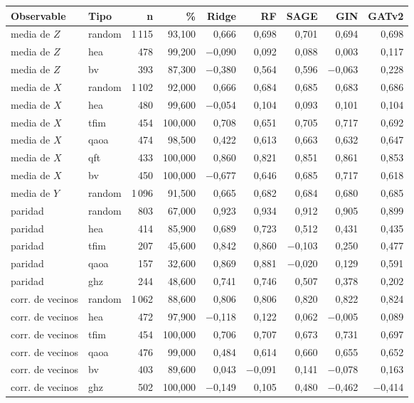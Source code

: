 \begin{table}[htbp]
    \centering
    {\footnotesize
    \begin{tabular}{@{}llrrrrrrr@{}}
        \toprule
        \textbf{Observable} & \textbf{Tipo} & \textbf{n} & \textbf{\%} & \textbf{Ridge} & \textbf{RF} & \textbf{SAGE} & \textbf{GIN} & \textbf{GATv2} \\
        \midrule
        media de $Z$ & random & 1\,115 & 93,100 & 0,666 & 0,698 & 0,701 & 0,694 & 0,698 \\
        media de $Z$ & hea & 478 & 99,200 & $-$0,090 & 0,092 & 0,088 & 0,003 & 0,117 \\
        media de $Z$ & bv & 393 & 87,300 & $-$0,380 & 0,564 & 0,596 & $-$0,063 & 0,228 \\
        media de $X$ & random & 1\,102 & 92,000 & 0,666 & 0,684 & 0,685 & 0,683 & 0,686 \\
        media de $X$ & hea & 480 & 99,600 & $-$0,054 & 0,104 & 0,093 & 0,101 & 0,104 \\
        media de $X$ & tfim & 454 & 100,000 & 0,708 & 0,651 & 0,705 & 0,717 & 0,692 \\
        media de $X$ & qaoa & 474 & 98,500 & 0,422 & 0,613 & 0,663 & 0,632 & 0,647 \\
        media de $X$ & qft & 433 & 100,000 & 0,860 & 0,821 & 0,851 & 0,861 & 0,853 \\
        media de $X$ & bv & 450 & 100,000 & $-$0,677 & 0,646 & 0,685 & 0,717 & 0,618 \\
        media de $Y$ & random & 1\,096 & 91,500 & 0,665 & 0,682 & 0,684 & 0,680 & 0,685 \\
        paridad & random & 803 & 67,000 & 0,923 & 0,934 & 0,912 & 0,905 & 0,899 \\
        paridad & hea & 414 & 85,900 & 0,689 & 0,723 & 0,512 & 0,431 & 0,435 \\
        paridad & tfim & 207 & 45,600 & 0,842 & 0,860 & $-$0,103 & 0,250 & 0,477 \\
        paridad & qaoa & 157 & 32,600 & 0,869 & 0,881 & $-$0,020 & 0,129 & 0,591 \\
        paridad & ghz & 244 & 48,600 & 0,741 & 0,746 & 0,507 & 0,378 & 0,202 \\
        corr. de vecinos & random & 1\,062 & 88,600 & 0,806 & 0,806 & 0,820 & 0,822 & 0,824 \\
        corr. de vecinos & hea & 472 & 97,900 & $-$0,118 & 0,122 & 0,062 & $-$0,005 & 0,089 \\
        corr. de vecinos & tfim & 454 & 100,000 & 0,706 & 0,707 & 0,673 & 0,731 & 0,697 \\
        corr. de vecinos & qaoa & 476 & 99,000 & 0,484 & 0,614 & 0,660 & 0,655 & 0,652 \\
        corr. de vecinos & bv & 403 & 89,600 & 0,043 & $-$0,091 & 0,141 & $-$0,078 & 0,163 \\
        corr. de vecinos & ghz & 502 & 100,000 & $-$0,149 & 0,105 & 0,480 & $-$0,462 & $-$0,414 \\
        \bottomrule
    \end{tabular}}


\end{table}
